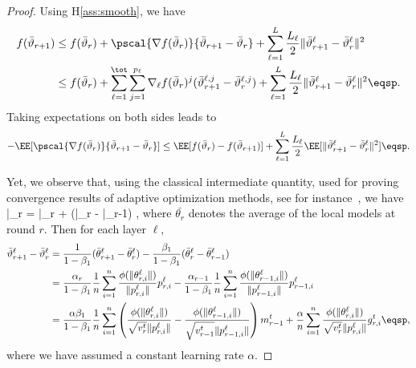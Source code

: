 \documentclass[nohyperref]{article}
\begin{document}
\begin{proof}
Using H\ref{ass:smooth}, we have
\begin{align}\notag
f(\bar{\vartheta}_{r+1}) &  \leq f(\bar{\vartheta}_r) + \pscal{\nabla f(\bar{\vartheta}_r)}{\bar{\vartheta}_{r+1} - \bar{\vartheta}_r} + \sum_{\ell =1}^L \frac{L_\ell}{2} \| \bar{\vartheta}^\ell_{r+1} - \bar{\vartheta}^\ell_r \|^2\\\notag
&  \leq f(\bar{\vartheta}_r) + \sum_{\ell=1}^\tot \sum_{j=1}^{p_\ell} \nabla_{\ell} f(\bar{\vartheta}_r)^j (\bar{\vartheta}^{\ell,j}_{r+1} - \bar{\vartheta}^{\ell,j}_r) + \sum_{\ell =1}^L \frac{L_\ell}{2} \| \bar{\vartheta}^\ell_{r+1} - \bar{\vartheta}^\ell_r \|^2  \eqsp.
\end{align}
Taking expectations on both sides leads to
\begin{align}\label{eq:main}
- \EE[  \pscal{\nabla f(\bar{\vartheta}_r)}{\bar{\vartheta}_{r+1} - \bar{\vartheta}_r}]  \leq  \EE[ f(\bar{\vartheta}_r) - f(\bar{\vartheta}_{r+1})] + \sum_{\ell =1}^L \frac{L_\ell}{2} \EE[  \| \bar{\vartheta}^\ell_{r+1} - \bar{\vartheta}^\ell_r \|^2] \eqsp.
\end{align}

Yet, we observe that, using the classical intermediate quantity, used for proving convergence results of adaptive optimization methods, see for instance~\citet{reddi2019convergence}, we have
\beq\label{eq:defseq}
\bar{\vartheta}_r = \bar{\theta}_r +  (\bar{\theta}_{r} - \bar{\theta}_{r-1}) \eqsp,
\eeq
where $\bar{\theta_r}$ denotes the average of the local models at round $r$.
Then for each layer $\ell$,
\begin{align}\label{eq:gap}
\bar{\vartheta}^\ell_{r+1} - \bar{\vartheta}^\ell_r  & = \frac{1}{1-\beta_1}(\bar{\theta}^\ell_{r+1} - \bar{\theta}^\ell_{r}) - \frac{\beta_1}{1-\beta_1}(\bar{\theta}^\ell_{r} - \bar{\theta}^\ell_{r-1}) \nonumber\\
& = \frac{\alpha_{r}}{1-\beta_1} \frac{1}{n} \sum_{i = 1}^n \frac{\phi(\|\theta_{r,i}^{\ell}\|)}{\|p_{r,i}^{\ell}\|} p_{r,i}^{\ell}  - \frac{\alpha_{r-1}}{1-\beta_1} \frac{1}{n} \sum_{i = 1}^n \frac{\phi(\|\theta_{r-1,i}^{\ell}\|)}{\|p_{r-1,i}^{\ell}\|} p_{r-1,i}^{\ell}\nonumber\\
& = \frac{\alpha \beta_1}{1-\beta_1} \frac{1}{n}  \sum_{i = 1}^n  \left( \frac{\phi(\|\theta_{r,i}^{\ell}\|)}{\sqrt{v^{t}_{r}} \|p_{r,i}^{\ell}\|} - \frac{\phi(\|\theta_{r-1,i}^{\ell}\|)}{\sqrt{v^{t}_{r-1}} \|p_{r-1,i}^{\ell}\|} \right) m^{t}_{r-1} + \frac{\alpha}{n} \sum_{i = 1}^n \frac{\phi(\|\theta_{r,i}^{\ell}\|)}{\sqrt{v^{t}_{r}} \|p_{r,i}^{\ell}\|} g^t_{r,i} \eqsp,
\end{align}
where we have assumed a constant learning rate $\alpha$.



\end{proof}
\end{document}

